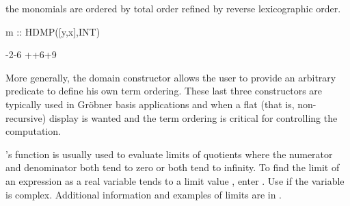 {{{{{{{{\begin{xtc}
\begin{xtccomment}
the monomials are ordered by total order refined by reverse
lexicographic order.
\end{xtccomment}
\begin{spadsrc}
m :: HDMP([y,x],INT) 
\end{spadsrc}
\begin{TeXOutput}
\begin{fricasmath}{6}
\TIMES {}-{2\TIMES {}\TIMES {}}-{6\TIMES {}\TIMES %
}++6\TIMES {}\TIMES {}+9\TIMES {}%
\end{fricasmath}
\end{TeXOutput}
\end{xtc}

More generally, the domain constructor
 allows the
user to provide an arbitrary predicate to define his own term ordering.
These last three constructors are typically used in
Gr\"{o}bner basis
applications and when a flat (that is, non-recursive) display is
wanted and the term ordering is critical for controlling the computation.

%

\Language{}'s  function is usually used to
evaluate limits of quotients where the numerator and denominator
both tend to zero or both tend to infinity.
To find the limit of an expression  as a real variable
 tends to a limit value , enter .
Use  if the variable is complex.
Additional information and examples of limits are in
.

}}}}}}}}
